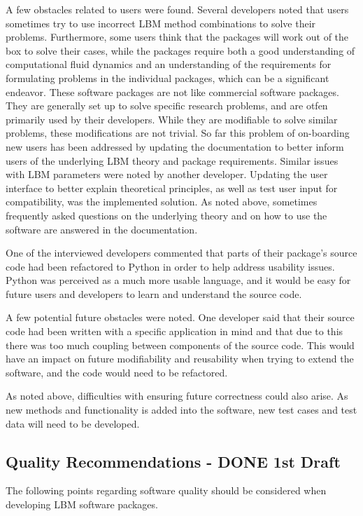 \documentclass[12pt, notitlepage]{article}
\begin{document}
A few obstacles related to users were found. Several developers noted that users sometimes try to use incorrect LBM method combinations to solve their problems. Furthermore, some users think that the packages will work out of the box to solve their cases, while the packages require both a good understanding of computational fluid dynamics and an understanding of the requirements for formulating problems in the individual packages, which can be a significant endeavor. These software packages are not like commercial software packages. They are generally set up to solve specific research problems, and are otfen primarily used by their developers. While they are modifiable to solve similar problems, these modifications are not trivial. So far this problem of on-boarding new users has been addressed by updating the documentation to better inform users of the underlying LBM theory and package requirements. Similar issues with LBM parameters were noted by another developer. Updating the user interface to better explain theoretical principles, as well as test user input for compatibility, was the implemented solution. As noted above, sometimes frequently asked questions on the underlying theory and on how to use the software are answered in the documentation.

One of the interviewed developers commented that parts of their package's source code had been refactored to Python in order to help address usability issues. Python was perceived as a much more usable language, and it would be easy for future users and developers to learn and understand the source code. 

A few potential future obstacles were noted. One developer said that their source code had been written with a specific application in mind and that due to this there was too much coupling between components of the source code. This would have an impact on future modifiability and reusability when trying to extend the software, and the code would need to be refactored.

As noted above, difficulties with ensuring future correctness could also arise. As new methods and functionality is added into the software, new test cases and test data will need to be developed.


\subsection{Quality Recommendations - DONE 1st Draft}\label{qualityrecommentations}

The following points regarding software quality should be considered when developing LBM software packages.
\end{document}
